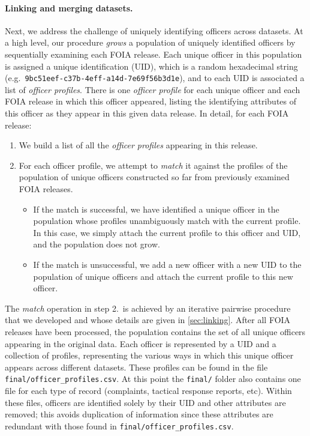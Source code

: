 \paragraph{Linking and merging datasets.}
Next, we address the challenge of uniquely identifying officers across datasets.
At a high level, our procedure \emph{grows} a population of uniquely identified
officers by sequentially examining each FOIA release. Each unique officer in
this population is assigned a unique identification (UID), which is a random hexadecimal string (e.g.\
\texttt{9bc51eef-c37b-4eff-a14d-7e69f56b3d1e}), and to each UID is associated
a list of \emph{officer profiles}. There is one \emph{officer profile} for each
unique officer and each FOIA release in which this officer appeared, listing
the identifying attributes of this officer as they appear in this given data
release. In detail, for each FOIA release:
\begin{enumerate}
	\item We build a list of all the \emph{officer profiles} appearing in this
		release.
	\item For each officer profile, we attempt to \emph{match} it against the
		profiles of the population of unique officers constructed so far from
		previously examined FOIA releases.
		\begin{itemize}
			\item If the match is successful, we have identified a unique officer in
				the population whose profiles unambiguously match with the
				current profile. In this case, we simply attach the current
				profile to this officer and UID, and
				the population does not grow.
			\item If the match is unsuccessful, we add a new officer with a new UID to the population of unique
				officers and attach the current profile to this new officer.
		\end{itemize}
\end{enumerate}

The \emph{match} operation in step 2.\ is achieved by an iterative pairwise
procedure that we developed and whose details are given  in \cref{sec:linking}.
After all FOIA releases have been processed, the population contains the set of
all unique officers appearing in the original data. Each officer is represented
by a UID and a collection of profiles, representing the various ways in which
this unique officer appears across different datasets. These profiles can be
found in the file \texttt{final/officer\_profiles.csv}.
At this point the \texttt{final/} folder also contains
one file for each type of record (complaints, tactical response reports, etc).
Within these files, officers are identified solely by their UID and other attributes
are removed; this avoids duplication of
information since these attributes are redundant with those found in
\texttt{final/officer\_profiles.csv}.

